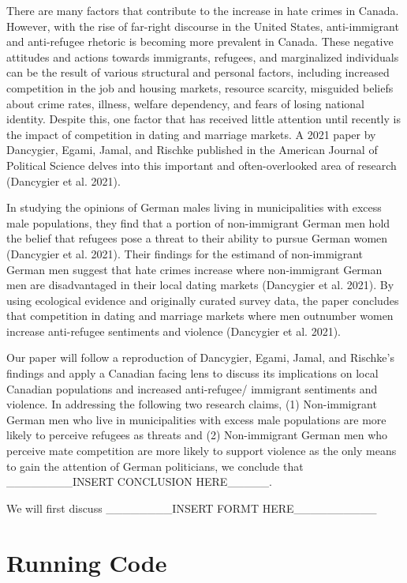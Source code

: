 \documentclass[
]{article}
\begin{document}
There are many factors that contribute to the increase in hate crimes in
Canada. However, with the rise of far-right discourse in the United
States, anti-immigrant and anti-refugee rhetoric is becoming more
prevalent in Canada. These negative attitudes and actions towards
immigrants, refugees, and marginalized individuals can be the result of
various structural and personal factors, including increased competition
in the job and housing markets, resource scarcity, misguided beliefs
about crime rates, illness, welfare dependency, and fears of losing
national identity. Despite this, one factor that has received little
attention until recently is the impact of competition in dating and
marriage markets. A 2021 paper by Dancygier, Egami, Jamal, and Rischke
published in the American Journal of Political Science delves into this
important and often-overlooked area of research (Dancygier et al. 2021).

In studying the opinions of German males living in municipalities with
excess male populations, they find that a portion of non-immigrant
German men hold the belief that refugees pose a threat to their ability
to pursue German women (Dancygier et al. 2021). Their findings for the
estimand of non-immigrant German men suggest that hate crimes increase
where non-immigrant German men are disadvantaged in their local dating
markets (Dancygier et al. 2021). By using ecological evidence and
originally curated survey data, the paper concludes that competition in
dating and marriage markets where men outnumber women increase
anti-refugee sentiments and violence (Dancygier et al. 2021).

Our paper will follow a reproduction of Dancygier, Egami, Jamal, and
Rischke's findings and apply a Canadian facing lens to discuss its
implications on local Canadian populations and increased anti-refugee/
immigrant sentiments and violence. In addressing the following two
research claims, (1) Non-immigrant German men who live in municipalities
with excess male populations are more likely to perceive refugees as
threats and (2) Non-immigrant German men who perceive mate competition
are more likely to support violence as the only means to gain the
attention of German politicians, we conclude that \_\_\_\_\_\_\_\_INSERT
CONCLUSION HERE\_\_\_\_\_.

We will first discuss \_\_\_\_\_\_\_\_INSERT FORMT
HERE\_\_\_\_\_\_\_\_\_\_

\hypertarget{running-code}{%
\section{Running Code}\label{running-code}}
\end{document}
